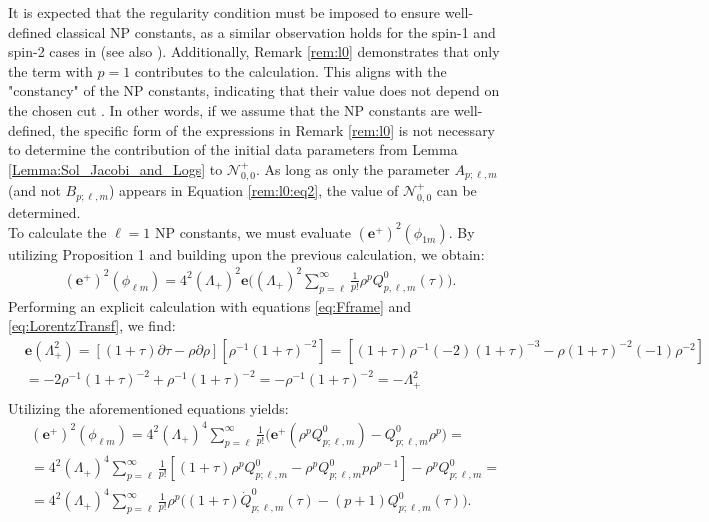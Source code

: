 It is expected that the regularity condition must be imposed to ensure well-defined classical NP constants, as a similar observation holds for the spin-1 and spin-2 cases in \cite{GasVal20} (see also \cite{Val98, Val99a}). Additionally, Remark \ref{rem:l0} demonstrates that only the term with $p=1$ contributes to the calculation. This aligns with the "constancy" of the NP constants, indicating that their value does not depend on the chosen cut \cite{NewPen68}. In other words, if we assume that the NP constants are well-defined, the specific form of the expressions in Remark \ref{rem:l0} is not necessary to determine the contribution of the initial data parameters from Lemma \ref{Lemma:Sol_Jacobi_and_Logs} to $\mathcal{N}^{+}_{0,0}$. As long as only the parameter $A_{p;\ell,m}$ (and not $B_{p;\ell,m}$) appears in Equation \ref{rem:l0:eq2}, the value of $\mathcal{N}^{+}_{0,0}$ can be determined.\\
To calculate the $\ell = 1$ NP constants, we must evaluate $(\boldsymbol{e}^{+})^{2}(\phi_{1m})$. By utilizing Proposition 1 and building upon the previous calculation, we obtain:
\begin{align}\label{eq:bmeplus2philmraw}
  (\boldsymbol{e}^{+})^2(\phi_{\ell m})= 4^2(\Lambda_{+})^{2}\boldsymbol{e} \Big((\Lambda_{+}{})^2 \sum_{p=\ell}^{\infty}\frac{1}{p!}\rho^{p}Q^{0}_{p,\ell,m}(\tau)\Big).
\end{align}
Performing an explicit calculation with equations \eqref{eq:Fframe} and \eqref{eq:LorentzTransf}, we find:
\begin{align}\label{eq:defQ1}
  & \boldsymbol{e}\left(\Lambda_{+}^{2}\right)=[(1+\tau) \partial \tau-\rho \partial \rho]\left[\rho^{-1}(1+\tau)^{-2}\right]=\left[(1+\tau) \rho^{-1}(-2)(1+\tau)^{-3}-\rho(1+\tau)^{-2}(-1) \rho^{-2}\right] \nonumber \\
  & =-2 \rho^{-1}(1+\tau)^{-2}+\rho^{-1}(1+\tau)^{-2}=-\rho^{-1}(1+\tau)^{-2}=-\Lambda_{+}^{2} \nonumber \\
\end{align}
Utilizing the aforementioned equations yields:
\begin{align}\label{eq:defQ1}
  & (\boldsymbol{e}^{+})^2(\phi_{\ell m})= 4^2(\Lambda_{+})^{4}\sum_{p=\ell}^{\infty} \frac{1}{p!}\big(\boldsymbol{e}^{+}\left(\rho^{p} Q_{p; \ell, m}^{0}\right)-Q_{p; \ell, m}^{0} \rho^{p}\big) = \nonumber \\
  & = 4^2(\Lambda_{+})^{4}\sum_{p=\ell}^{\infty} \frac{1}{p!}\left[(1+\tau) \rho^{p} Q_{p; \ell, m}^{0}-\rho^{p} Q_{p; \ell, m}^{0} p \rho^{p-1}\right]-\rho^{p} Q_{p; \ell, m}^{0} = \nonumber \\
  & = 4^2(\Lambda_{+})^{4}\sum_{p=\ell}^{\infty} \frac{1}{p!}\rho^{p}\big((1+\tau)\dot{Q}^{0}_{p;\ell,m}(\tau)-(p+1){Q}^{0}_{p;\ell,m}(\tau)\big).
\end{align}
